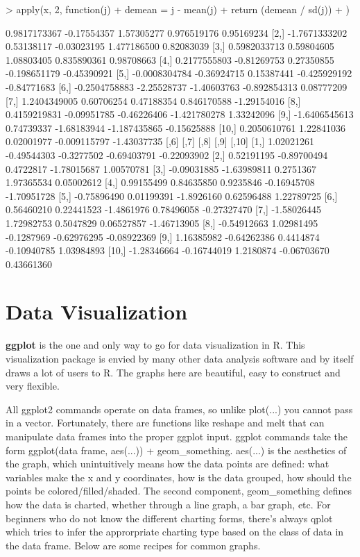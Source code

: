 \documentclass{article}
\begin{document}
\begin{Schunk}
\begin{Sinput}
> apply(x, 2, function(j) {
+     demean = j - mean(j)
+     return (demean / sd(j))
+ })
\end{Sinput}
\begin{Soutput}
               [,1]        [,2]        [,3]         [,4]        [,5]
 [1,]  0.9817173367 -0.17554357  1.57305277  0.976519176  0.95169234
 [2,] -1.7671333202  0.53138117 -0.03023195  1.477186500  0.82083039
 [3,]  0.5982033713  0.59804605  1.08803405  0.835890361  0.98708663
 [4,]  0.2177555803 -0.81269753  0.27350855 -0.198651179 -0.45390921
 [5,] -0.0008304784 -0.36924715  0.15387441 -0.425929192 -0.84771683
 [6,] -0.2504758883 -2.25528737 -1.40603763 -0.892854313  0.08777209
 [7,]  1.2404349005  0.60706254  0.47188354  0.846170588 -1.29154016
 [8,]  0.4159219831 -0.09951785 -0.46226406 -1.421780278  1.33242096
 [9,] -1.6406545613  0.74739337 -1.68183944 -1.187435865 -0.15625888
[10,]  0.2050610761  1.22841036  0.02001977 -0.009115797 -1.43037735
             [,6]        [,7]       [,8]        [,9]       [,10]
 [1,]  1.02021261 -0.49544303 -0.3277502 -0.69403791 -0.22093902
 [2,]  0.52191195 -0.89700494  0.4722817 -1.78015687  1.00570781
 [3,] -0.09031885 -1.63989811  0.2751367  1.97365534  0.05002612
 [4,]  0.99155499  0.84635850  0.9235846 -0.16945708 -1.70951728
 [5,] -0.75896490  0.01199391 -1.8926160  0.62596488  1.22789725
 [6,]  0.56460210  0.22441523 -1.4861976  0.78496058 -0.27327470
 [7,] -1.58026445  1.72982753  0.5047829  0.06527857 -1.46713905
 [8,] -0.54912663  1.02981495 -0.1287969 -0.62976295 -0.08922369
 [9,]  1.16385982 -0.64262386  0.4414874 -0.10940785  1.03984893
[10,] -1.28346664 -0.16744019  1.2180874 -0.06703670  0.43661360
\end{Soutput}
\end{Schunk}

\section{Data Visualization}

\textbf{ggplot} is the one and only way to go for data visualization in R.
This visualization package is envied by many other data analysis software
and by itself draws a lot of users to R.  The graphs here are beautiful,
easy to construct and very flexible.

All ggplot2 commands operate on data frames, so unlike plot(...) you
cannot pass in a vector.  Fortunately, there are functions like reshape
and melt that can manipulate data frames into the proper ggplot input. 
ggplot commands take the form ggplot(data frame, aes(...)) + geom\_something.
aes(...) is the aesthetics of the graph, which unintuitively means
how the data points are defined: what variables make the x and y coordinates,
how is the data grouped, how should the points be colored/filled/shaded.  The
second component, geom\_something defines how the data is charted, whether through
a line graph, a bar graph, etc.  For beginners who do not know the different
charting forms, there's always qplot which tries to infer the approrpriate
charting type based on the class of data in the data frame.
Below are some recipes for common graphs.
\end{document}
